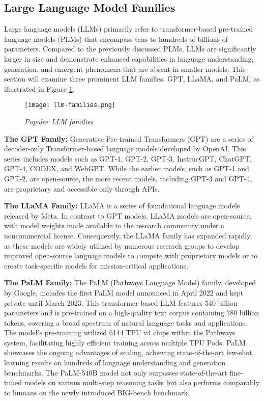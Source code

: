 \subsection{Large Language Model Families}

Large language models (LLMs) primarily refer to transformer-based pre-trained language models (PLMs) that encompass tens to hundreds of billions of parameters. Compared to the previously discussed PLMs, LLMs are significantly larger in size and demonstrate enhanced capabilities in language understanding, generation, and emergent phenomena that are absent in smaller models. This section will examine three prominent LLM families: GPT, LLaMA, and PaLM, as illustrated in Figure \ref{fig:llm-families}.

\begin{figure}[H]
    \centering
    \texttt{[image: llm-families.png]}
    \caption{
        \it{Popular LLM families \cite{minaee2024large}}
    }
    \label{fig:llm-families}
\end{figure}

\textbf{The GPT Family:} Generative Pre-trained Transformers (GPT) are a series of decoder-only Transformer-based language models developed by OpenAI. This series includes models such as GPT-1, GPT-2, GPT-3, InstrucGPT, ChatGPT, GPT-4, CODEX, and WebGPT. While the earlier models, such as GPT-1 and GPT-2, are open-source, the more recent models, including GPT-3 and GPT-4, are proprietary and accessible only through APIs.

\textbf{The LLaMA Family:} LLaMA is a series of foundational language models released by Meta. In contrast to GPT models, LLaMA models are open-source, with model weights made available to the research community under a noncommercial license. Consequently, the LLaMA family has expanded rapidly, as these models are widely utilized by numerous research groups to develop improved open-source language models to compete with proprietary models or to create task-specific models for mission-critical applications.

\textbf{The PaLM Family:} The PaLM (Pathways Language Model) family, developed by Google, includes the first PaLM model \cite{chowdhery2022palm} announced in April 2022 and kept private until March 2023. This transformer-based LLM features 540 billion parameters and is pre-trained on a high-quality text corpus containing 780 billion tokens, covering a broad spectrum of natural language tasks and applications. The model's pre-training utilized 6144 TPU v4 chips within the Pathways system, facilitating highly efficient training across multiple TPU Pods. PaLM showcases the ongoing advantages of scaling, achieving state-of-the-art few-shot learning results on hundreds of language understanding and generation benchmarks. The PaLM-540B model not only surpasses state-of-the-art fine-tuned models on various multi-step reasoning tasks but also performs comparably to humans on the newly introduced BIG-bench benchmark.


